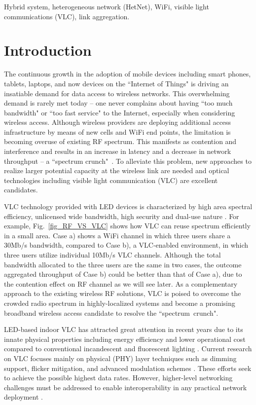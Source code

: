 \documentclass[10pt,journal]{IEEEtran}
\begin{document}
\begin{IEEEkeywords}
Hybrid system, heterogeneous network (HetNet), WiFi, visible light communications (VLC), link aggregation.
\end{IEEEkeywords}

\section{Introduction}
The continuous growth in the adoption of mobile devices including
smart phones, tablets, laptops, and now devices on the ``Internet of
Things" is driving an insatiable demand for data access to wireless
networks. This overwhelming demand is rarely met today -- one never
complains about having ``too much bandwidth" or ``too fast service" to
the Internet, especially when considering wireless access. Although
wireless providers are deploying additional access infrastructure by
means of new cells and WiFi end points, the limitation is becoming
overuse of existing RF spectrum. This manifests as contention and
interference and results in an increase in latency and a decrease in
network throughput -- a ``spectrum crunch"~\cite{kavehrad2013optical}. To alleviate this problem, new approaches
to realize larger potential capacity at the wireless link are needed and optical
technologies including visible light communication (VLC) are excellent candidates.

VLC technology provided with LED devices is characterized by high area spectral efficiency,
unlicensed wide bandwidth, high security and dual-use nature
\cite{kahn1997wireless}. For example, Fig.~\ref{fig_RF_VS_VLC} shows
how VLC can reuse spectrum efficiently in a small area. Case a) shows
a WiFi channel in which three users share a 30Mb/s bandwidth, compared
to Case b), a VLC-enabled environment, in which three users utilize
individual 10Mb/s VLC channels. Although the total bandwidth allocated
to the three users are the same in two cases, the outcome aggregated
throughput of Case b) could be better than that of Case a), due to the
contention effect on RF channel as we will see later. As a complementary
approach to the existing wireless RF solutions, VLC is poised to overcome the
crowded radio spectrum in highly-localized systems and become a
promising broadband wireless access candidate to resolve the ``spectrum~crunch".

LED-based indoor VLC has attracted great attention in recent years due
to its innate physical properties including energy efficiency and
lower operational cost compared to conventional incandescent and
fluorescent lighting \cite{komine2004fundamental}. Current research on
VLC focuses mainly on physical (PHY) layer techniques such as dimming
support, flicker mitigation, and advanced modulation schemes
\cite{rajagopal2012ieee}. These efforts seek to achieve the possible highest
data rates. However, higher-level networking challenges must be
addressed to enable interoperability in any practical network
deployment
\cite{rahaim2011hybrid,lee2013performance,chowdhury2013energy,huang2013design}.
\end{document}
